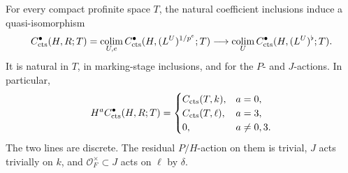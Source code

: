 \begin{theorem}
\label{thm:decompletion}
For every compact profinite space $T$, the natural coefficient
inclusions induce a quasi-isomorphism
\begin{equation}
 \label{eq:natural-decompletion}
 C^\bullet_{\mathrm{cts}}(H,R;T)
 =\operatorname*{colim}_{U,e}C^\bullet_{\mathrm{cts}}(H,(L^U)^{1/p^e};T)
 \longrightarrow
 \operatorname*{colim}_UC^\bullet_{\mathrm{cts}}(H,(L^U)^\flat;T).
\end{equation}
It is natural in $T$, in marking-stage inclusions, and for the
$P$- and $J$-actions.  In particular,
\begin{equation}
 \label{eq:perfect-H-cohomology}
 H^aC^\bullet_{\mathrm{cts}}(H,R;T)=
 \begin{cases}
 C_{\mathrm{cts}}(T,k),&a=0,\\
 C_{\mathrm{cts}}(T,\ell),&a=3,\\
 0,&a\ne0,3.
 \end{cases}
\end{equation}
The two lines are discrete.  The residual $P/H$-action on them
is trivial, $J$ acts trivially on $k$, and
$\mathcal O_F^\times\subset J$ acts on $\ell$ by $\delta$.
\end{theorem}

